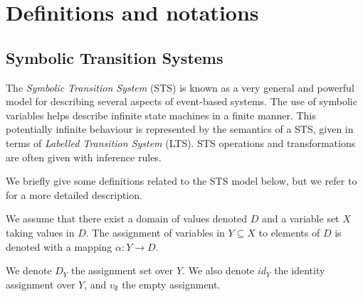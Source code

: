 %
\chapter{Definitions and notations}
\label{sec:definitions}


\section{Symbolic Transition Systems}
\label{sec:definitions:sts}

The \textit{Symbolic Transition System} (STS) is known as a very
general and powerful model for describing several aspects of
event-based systems. The use of symbolic variables helps describe
infinite state machines in a finite manner. This potentially
infinite behaviour is represented by the semantics of a STS,
given in terms of \textit{Labelled Transition System} (LTS). STS
operations and transformations are often given with inference
rules.

We briefly give some definitions related to the STS model below,
but we refer to \cite{FTW05} for a more detailed description.

\begin{definition}
We assume that there exist a domain of values denoted $D$ and a
variable set $X$ taking values in $D$. The assignment of
variables in $Y \subseteq X$ to elements of $D$ is denoted with a
mapping  $\alpha: Y \rightarrow D$.

We denote $D_Y$ the assignment set over $Y$. We also denote
$id_Y$ the identity assignment over $Y$, and $v_\emptyset$ the
empty assignment.
\end{definition}

